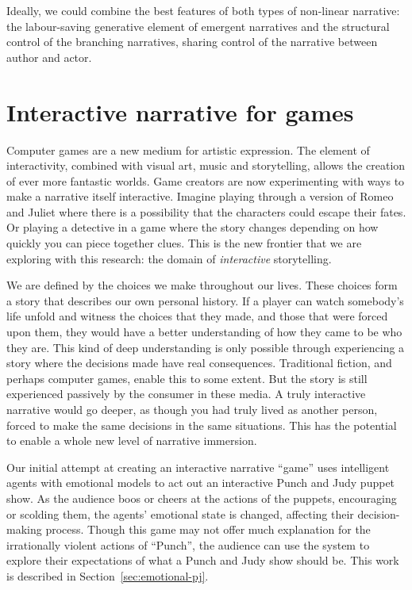 \documentclass[11pt]{report}
\begin{document}
Ideally, we could combine the best features of both types of non-linear
narrative: the labour-saving generative element of emergent narratives and the
structural control of the branching narratives, sharing control of the narrative
between author and actor.

\section{Interactive narrative for games}
Computer games are a new medium for artistic expression. The element of
interactivity, combined with visual art, music and storytelling, allows the
creation of ever more fantastic worlds. Game creators are now experimenting with
ways to make a narrative itself interactive. Imagine playing through a version
of Romeo and Juliet where there is a possibility that the characters could
escape their fates. Or playing a detective in a game where the story changes
depending on how quickly you can piece together clues. This is the new frontier that we are exploring with this research: the domain of \emph{interactive} storytelling.

We are defined by the choices we make throughout our lives. These choices form a
story that describes our own personal history. If a player can watch somebody's
life unfold and witness the choices that they made, and those that were forced
upon them, they would have a better understanding of how they came to be who they
are. This kind of deep understanding is only possible through experiencing a
story where the decisions made have real consequences. Traditional fiction, and
perhaps computer games, enable this to some extent. But the story is still
experienced passively by the consumer in these media. A truly interactive
narrative would go deeper, as though you had truly lived as another person,
forced to make the same decisions in the same situations. This has the potential
to enable a whole new level of narrative immersion.

Our initial attempt at creating an interactive narrative ``game'' uses
intelligent agents with emotional models to act out an interactive Punch and
Judy puppet show. As the audience boos or cheers at the actions of the puppets,
encouraging or scolding them, the agents' emotional state is changed, affecting
their decision-making process. Though this game may not offer much explanation
for the irrationally violent actions of ``Punch'', the audience can use the
system to explore
their expectations of what a Punch and Judy show should be. This work is
described in Section~\ref{sec:emotional-pj}.
\end{document}
